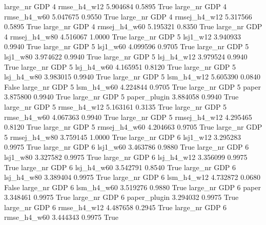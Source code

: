   large_nr      GDP                 4  rmse_h4_w12    5.904684      0.5895    True
  large_nr      GDP                 4  rmse_h4_w60    5.047675      0.9550    True
  large_nr      GDP                 4 rmsej_h4_w12    5.317566      0.5895    True
  large_nr      GDP                 4 rmsej_h4_w60    5.195321      0.8350    True
  large_nr      GDP                 4 rmsej_h4_w80    4.516067      1.0000    True
  large_nr      GDP                 5     lsj1_w12    3.940933      0.9940    True
  large_nr      GDP                 5     lsj1_w60    4.099596      0.9705    True
  large_nr      GDP                 5     lsj1_w80    3.974622      0.9940    True
  large_nr      GDP                 5   lsj_h4_w12    3.979524      0.9940    True
  large_nr      GDP                 5   lsj_h4_w60    4.165951      0.8120    True
  large_nr      GDP                 5   lsj_h4_w80    3.983015      0.9940    True
  large_nr      GDP                 5   lsm_h4_w12    5.605390      0.0840   False
  large_nr      GDP                 5   lsm_h4_w60    4.224844      0.9705    True
  large_nr      GDP                 5        paper    3.875800      0.9940    True
  large_nr      GDP                 5 paper_plugin    3.884058      0.9940    True
  large_nr      GDP                 5  rmse_h4_w12    5.163161      0.3135    True
  large_nr      GDP                 5  rmse_h4_w60    4.067363      0.9940    True
  large_nr      GDP                 5 rmsej_h4_w12    4.295465      0.8120    True
  large_nr      GDP                 5 rmsej_h4_w60    4.204663      0.9705    True
  large_nr      GDP                 5 rmsej_h4_w80    3.759145      1.0000    True
  large_nr      GDP                 6     lsj1_w12    3.295283      0.9975    True
  large_nr      GDP                 6     lsj1_w60    3.463786      0.9880    True
  large_nr      GDP                 6     lsj1_w80    3.327582      0.9975    True
  large_nr      GDP                 6   lsj_h4_w12    3.356099      0.9975    True
  large_nr      GDP                 6   lsj_h4_w60    3.542791      0.8540    True
  large_nr      GDP                 6   lsj_h4_w80    3.389404      0.9975    True
  large_nr      GDP                 6   lsm_h4_w12    4.732872      0.0680   False
  large_nr      GDP                 6   lsm_h4_w60    3.519276      0.9880    True
  large_nr      GDP                 6        paper    3.348461      0.9975    True
  large_nr      GDP                 6 paper_plugin    3.294032      0.9975    True
  large_nr      GDP                 6  rmse_h4_w12    4.487658      0.2945    True
  large_nr      GDP                 6  rmse_h4_w60    3.444343      0.9975    True
